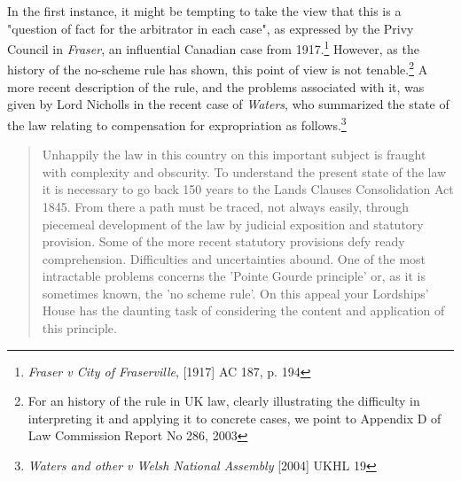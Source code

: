 In the first instance, it might be tempting to take the view that this is a "question of fact for the arbitrator in each case", as expressed by the Privy Council in \emph{Fraser}, an influential Canadian case from 1917.\footnote{\emph{Fraser v City of Fraserville}, [1917] AC 187, p. 194} However, as the history of the no-scheme rule has shown, this point of view is not tenable.\footnote{For an history of the rule in UK law, clearly illustrating the difficulty in interpreting it and applying it to concrete cases, we point to Appendix D of Law Commission Report No 286, 2003} A more recent description of the rule, and the problems associated with it, was given by Lord Nicholls in the recent case of \emph{Waters}, who summarized the state of the law relating to compensation for expropriation as follows.\footnote{\emph{Waters and other v Welsh National Assembly} [2004] UKHL 19}

\begin{quote}
Unhappily the law in this country on this important subject is fraught with complexity and obscurity. To understand the present state of the law it is necessary to go back 150 years to the Lands Clauses Consolidation Act 1845. From there a path must be traced, not always easily, through piecemeal development of the law by judicial exposition and statutory provision. Some of the more recent statutory provisions defy ready comprehension. Difficulties and uncertainties abound. One of the most intractable problems concerns the 'Pointe Gourde principle' or, as it is sometimes known, the 'no scheme rule'. On this appeal your Lordships' House has the daunting task of considering the content and application of this principle.
\end{quote}

